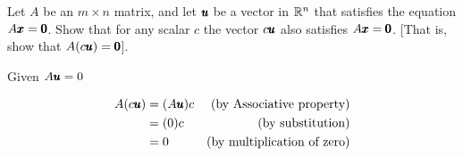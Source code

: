 \documentclass{../mathhomework}
\newcommand{\By}[1]{\text{(by #1)}}
\begin{document}
\begin{problem}[1.5\#39s]
    Let $A$ be an $m \times n$ matrix, and let $\pmb{u}$ be a vector in $\mathbb{R}^n$ that satisfies the equation $A\pmb{x} = \pmb{0}$. Show that for any scalar $c$ the vector $c\pmb{u}$ also satisfies $A\pmb{x} = \pmb{0}$. [That is, show that $A(c\pmb{u}) = \pmb{0}$].

    \begin{solution}
        Given $A\pmb{u} = 0$

        \begin{align*}
            A(c\Vect{u}) & = (A\Vect{u})c & \By{Associative property} \\
            & = (0)c & \By{substitution} \\
            & = 0 & \By{multiplication of zero}
        \end{align*}
    \end{solution}
\end{problem}
\end{document}
